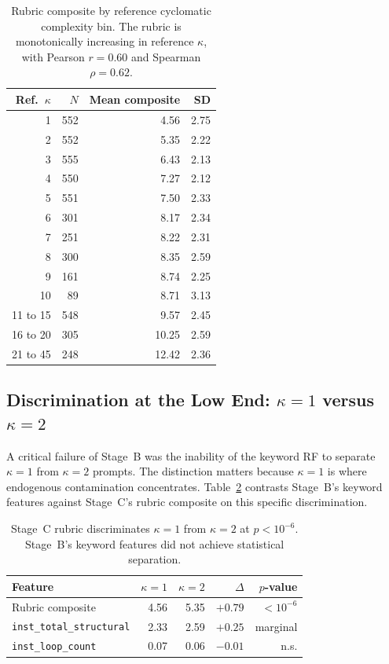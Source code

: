 \documentclass[conference]{IEEEtran}
\begin{document}
\begin{table}[h]
\centering
\caption{Rubric composite by reference cyclomatic complexity bin. The rubric is monotonically increasing in reference $\kappa$, with Pearson $r=0.60$ and Spearman $\rho=0.62$.}
\label{tab:rubric-ref-cc}
\begin{tabular}{@{}rrrr@{}}
\toprule
Ref.\ $\kappa$ & $N$ & Mean composite & SD \\
\midrule
1     & 552 & 4.56  & 2.75 \\
2     & 552 & 5.35  & 2.22 \\
3     & 555 & 6.43  & 2.13 \\
4     & 550 & 7.27  & 2.12 \\
5     & 551 & 7.50  & 2.33 \\
6     & 301 & 8.17  & 2.34 \\
7     & 251 & 8.22  & 2.31 \\
8     & 300 & 8.35  & 2.59 \\
9     & 161 & 8.74  & 2.25 \\
10    & 89  & 8.71  & 3.13 \\
11 to 15 & 548 & 9.57  & 2.45 \\
16 to 20 & 305 & 10.25 & 2.59 \\
21 to 45 & 248 & 12.42 & 2.36 \\
\bottomrule
\end{tabular}
\end{table}

\subsection{Discrimination at the Low End: $\kappa=1$ versus $\kappa=2$}

A critical failure of Stage~B was the inability of the keyword RF to separate $\kappa=1$ from $\kappa=2$ prompts. The distinction matters because $\kappa=1$ is where endogenous contamination concentrates. Table~\ref{tab:low-end-separation} contrasts Stage~B's keyword features against Stage~C's rubric composite on this specific discrimination.

\begin{table}[h]
\centering
\caption{Stage~C rubric discriminates $\kappa=1$ from $\kappa=2$ at $p<10^{-6}$. Stage~B's keyword features did not achieve statistical separation.}
\label{tab:low-end-separation}
\begin{tabular}{@{}lrrrr@{}}
\toprule
Feature & $\kappa=1$ & $\kappa=2$ & $\Delta$ & $p$-value \\
\midrule
Rubric composite                  & 4.56 & 5.35 & $+0.79$ & $<10^{-6}$ \\
\texttt{inst\_total\_structural}  & 2.33 & 2.59 & $+0.25$ & marginal \\
\texttt{inst\_loop\_count}        & 0.07 & 0.06 & $-0.01$ & n.s. \\
\bottomrule
\end{tabular}
\end{table}
\end{document}
